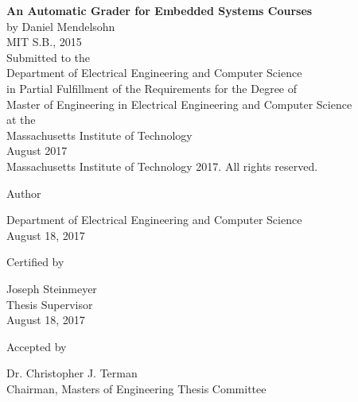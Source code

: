 \documentclass[12pt]{article}
\newcommand{\mytitle}{\textbf{An Automatic Grader for Embedded Systems Courses}}
\newcommand{\mydate}{August 18, 2017}
\begin{document}
\begin{titlepage}

\centering
\mytitle \\
\vspace{12pt}
by Daniel Mendelsohn \\
MIT S.B., 2015 \\
\vspace{12pt}
Submitted to the \\
Department of Electrical Engineering and Computer Science \\
in Partial Fulfillment of the Requirements for the Degree of \\
\vspace{12pt}
Master of Engineering in Electrical Engineering and Computer Science \\
\vspace{12pt}
at the \\
\vspace{12pt}
Massachusetts Institute of Technology \\
\vspace{12pt}
August 2017 \\
\vspace{12pt}
\textcopyright \hspace{0.05in} Massachusetts Institute of Technology 2017.  All rights reserved. \\
\vspace{48pt}

Author \dotfill \\
\begin{flushright}
Department of Electrical Engineering and Computer Science \\
\mydate
\end{flushright}
\vspace{36pt}

Certified by \dotfill \\
\begin{flushright}
Joseph Steinmeyer \\
Thesis Supervisor \\
\mydate
\end{flushright}
\vspace{24pt}

Accepted by \dotfill \\
\begin{flushright}
Dr. Christopher J. Terman \\
Chairman, Masters of Engineering Thesis Committee
\end{flushright}

\end{titlepage}
\end{document}
